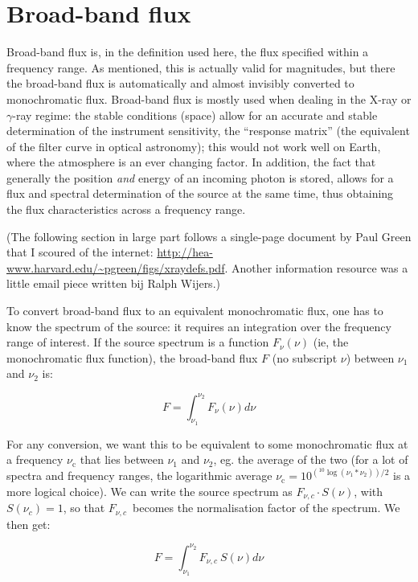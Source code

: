 \documentclass[12pt,a4paper]{article}
\newcommand{\fv}{\ensuremath{F_{\nu}}}
\newcommand{\fvc}{\ensuremath{F_{\nu, c}}}
\begin{document}
\section*{Broad-band flux}

Broad-band flux is, in the definition used here, the flux specified within a frequency range. As mentioned, this is actually valid for magnitudes, but there the broad-band flux is automatically and almost invisibly converted to monochromatic flux. Broad-band flux is mostly used when dealing in the X-ray or $\gamma$-ray regime: the stable conditions (space) allow for an accurate and stable determination of the instrument sensitivity, the ``response matrix'' (the equivalent of the filter curve in optical astronomy); this would not work well on Earth, where the atmosphere is an ever changing factor. In addition, the fact that generally the position \emph{and} energy of an incoming photon is stored, allows for a flux and spectral determination of the source at the same time, thus obtaining the flux characteristics across a frequency range.

(The following section in large part follows a single-page document by Paul Green  that I scoured of the internet: \url{http://hea-www.harvard.edu/~pgreen/figs/xraydefs.pdf}. Another information resource was a little email piece written bij Ralph Wijers.)

To convert broad-band flux to an equivalent monochromatic flux, one has to know the spectrum of the source: it requires an integration over the frequency range of interest. If the source spectrum is a function $\fv (\nu)$ (ie, the monochromatic flux function), the broad-band flux $F$ (no subscript $\nu$) between $\nu_1$ and $\nu_2$ is:

\begin{equation*}
F = \int_{\nu_1}^{\nu_2} \fv (\nu) d\nu
\end{equation*}

For any conversion, we want this to be equivalent to some monochromatic flux at a frequency $\nu_{\mathrm{c}}$ that lies between  $\nu_1$ and $\nu_2$, eg. the average of the two (for a lot of spectra and frequency ranges, the logarithmic average $\nu_{\mathrm{c}} = 10^{({}^{10}\log (\nu_1 * \nu_2))/2}$ is a more logical choice). We can write the source spectrum as $\fvc \cdot S (\nu)$, with $S (\nu_c) = 1$, so that \fvc\ becomes the normalisation factor of the spectrum. We then get:

\begin{equation*}
F = \int_{\nu_1}^{\nu_2} \fvc\ S (\nu) d\nu 
\end{equation*}
\end{document}
